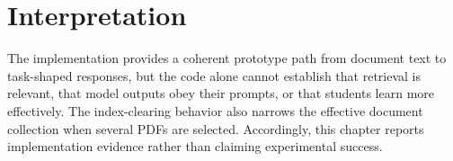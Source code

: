 \section{Interpretation}
The implementation provides a coherent prototype path from document text to task-shaped responses, but the code alone cannot establish that retrieval is relevant, that model outputs obey their prompts, or that students learn more effectively. The index-clearing behavior also narrows the effective document collection when several PDFs are selected. Accordingly, this chapter reports implementation evidence rather than claiming experimental success.
